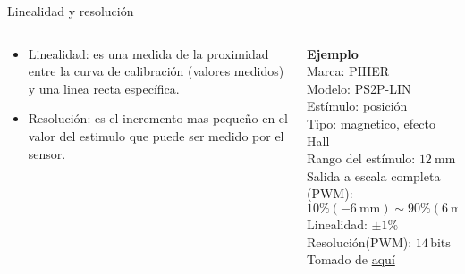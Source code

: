 \documentclass[aspectratio=169]{beamer}
\begin{document}
\begin{frame}{Linealidad y resolución}
    \begin{columns}[c, onlytextwidth]
        \begin{column}{0.55\textwidth}
            \begin{itemize}
                \item Linealidad: es una medida de la proximidad entre la curva de calibración (valores medidos) y una linea recta específica.
                \item Resolución: es el incremento mas pequeño en el valor del estimulo que puede ser medido por el sensor. 
            \end{itemize}
        \end{column}
        \begin{column}{0.40\textwidth}
            \textbf{Ejemplo}\\[4pt]
            Marca: PIHER\\[4pt]
            Modelo: PS2P-LIN\\[4pt]
            Estímulo: posición\\[4pt]
            Tipo: magnetico, efecto Hall\\[4pt]
            Rango del estímulo: $\SI{12}{\milli\meter}$\\[4pt]
            Salida a escala completa (PWM): $10\% (\SI{-6}{\milli\meter}) \sim 90\% (\SI{6}{\milli\meter})$\\[4pt]
            Linealidad: $\pm 1 \%$ \\[4pt]
            Resolución(PWM): $14\,\mathrm{bits}$\\[10pt]
            \tiny{Tomado de \href{https://www.piher.net/products/contactless-position-sensors/linear-position-sensors/hall-effect-linear-position-sensors/ps2p-lin/}{aquí}}
        \end{column}
    \end{columns}
\end{frame}
\end{document}
